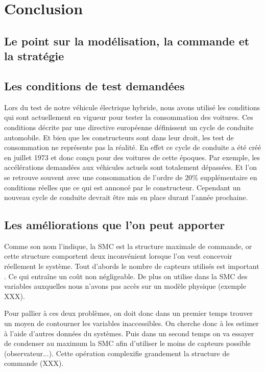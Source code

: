 \section{Conclusion}

\subsection{Le point sur la modélisation, la commande et la stratégie}

\subsection{Les conditions de test demandées}

Lors du test de notre véhicule électrique hybride, nous avons utilisé les conditions qui sont actuellement en vigueur pour tester la consommation des voitures. Ces conditions décrite par une directive européenne définissent un cycle de conduite automobile. Et bien que les constructeurs sont dans leur droit, les test de consommation ne représente pas la réalité. En effet ce cycle de conduite a été créé en juillet 1973 et donc conçu pour des voitures de cette époques. Par exemple, les accélérations demandées aux véhicules actuels sont totalement dépassées. Et l'on se retrouve souvent avec une consommation de l'ordre de 20\% supplémentaire en conditions réelles que ce qui est annoncé par le constructeur. Cependant un nouveau cycle de conduite devrait être mis en place durant l'année prochaine. 


\subsection{Les améliorations que l'on peut apporter}

Comme son nom l'indique, la SMC est la structure maximale de commande, or cette structure comportent deux inconvénient lorsque l'on veut concevoir réellement le système. Tout d'abords le nombre de capteurs utilisés est important . Ce qui entraîne un coût non négligeable. De plus on utilise dans la SMC des variables auxquelles nous n'avons pas accès sur un modèle physique (exemple XXX). 

Pour pallier à ces deux problèmes, on doit donc dans un premier temps trouver un moyen de contourner les variables inaccessibles. On cherche donc à les estimer à l'aide d'autres données du systèmes. Puis dans un second temps on va essayer de condenser au maximum la SMC afin d'utiliser le moins de capteurs possible (observateur...). Cette opération complexifie grandement la structure de commande (XXX). 





